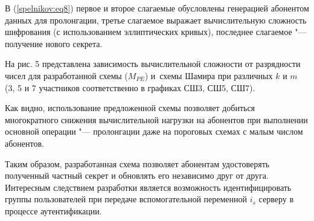 В (\ref{spelnikov:eq8}) первое и второе слагаемые обусловлены генерацией абонентом данных для
пролонгации, третье слагаемое выражает вычислительную сложность шифрования
(с использованием эллиптических кривых), последнее слагаемое "--- получение
нового секрета.

На рис. 5 представлена зависимость вычислительной сложности от
разрядности чисел для разработанной схемы ($M_{PE} $) и~схемы Шамира при
различных $k$ и $m$ (3, 5 и 7 участников соответственно в графиках СШ3, СШ5, СШ7).



Как видно, использование предложенной схемы позволяет добиться многократного
снижения вычислительной нагрузки на абонентов при выполнении основной
операции "--- пролонгации даже на пороговых схемах с малым числом абонентов.

Таким образом, разработанная схема позволяет абонентам удостоверять
полученный частный секрет и  обновлять его независимо друг от друга.
Интересным следствием разработки является возможность идентифицировать
группы пользователей при передаче вспомогательной переменной $i_s $
серверу в процессе аутентификации.



